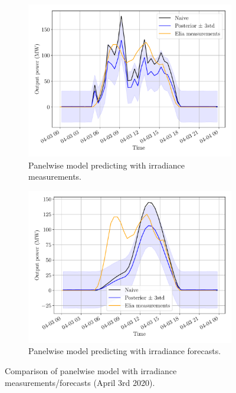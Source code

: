 \documentclass[a4paper, 12pt]{article}
\begin{document}
\begin{figure}[H]
	\centering
	\begin{subfigure}{0.48\textwidth}
		\centering
		\includegraphics[width=\textwidth]{resources/pdf/solar_panelwise_meas_meas_START_FOR_03-04-2020.pdf}
		\caption{Panelwise model predicting with irradiance measurements.}
		\label{fig:panelwise_meas_meas}
	\end{subfigure}
	\hspace{0.5em}
	\begin{subfigure}{0.48\textwidth}
		\centering
		\includegraphics[width=\textwidth]{resources/pdf/solar_panelwise_meas_for_START_FOR_03-04-2020.pdf}
		\caption{Panelwise model predicting with irradiance forecasts.}
		\label{fig:panelwise_meas_for}
	\end{subfigure}
	\caption{Comparison of panelwise model with irradiance measurements/forecasts (April 3rd 2020).}
	\label{fig:comparison_meas_meas_meas_for_panelwise}
\end{figure}
\end{document}
